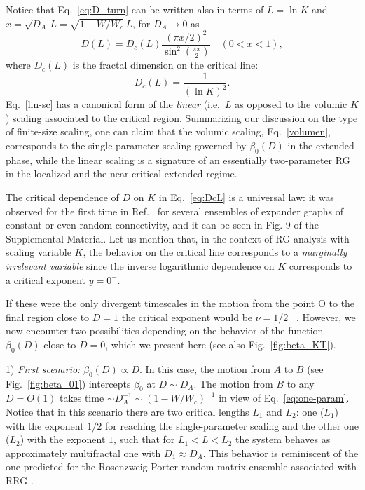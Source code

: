 \documentclass[reprint,aps,prl,superscriptaddress,english,nolongbibliography]{revtex4-1}
\begin{document}
Notice that Eq.~\eqref{eq:D_turn} can be written also in terms of $L=\ln K$ and  $x=\sqrt{D_A}\,L=\sqrt{1-W/W_{c}}\,L$, for $D_A\to 0$ as
\begin{equation}\label{lin-sc}
    D(L)=D_{c}(L) \frac{(\pi x/2)^{2}}{\sin^{2}(\frac{\pi x}{2})}\quad (0<x<1),
\end{equation}
where $D_{c}(L)$ is the fractal dimension on the critical line:
\begin{equation}
    D_c(L)=\frac{1}{(\ln K)^2}.
    \label{eq:DcL}
\end{equation}
Eq.~\eqref{lin-sc} has a canonical form of  the {\it linear} (i.e.\ $L$ as opposed to the volumic $K$ \cite{Mata2017Scaling}) scaling associated to the critical region. 
Summarizing our discussion on the type of finite-size scaling, one can claim that the volumic scaling, Eq.~\eqref{volumen}, corresponds to the single-parameter scaling governed by $\beta_{0}(D)$ in the extended phase, while the linear scaling is a signature of an essentially two-parameter RG in the localized and the near-critical extended regime.

The critical dependence of $D$ on $K$ in Eq.~\eqref{eq:DcL} is a universal law: it was observed for the first time in Ref.~\cite{sierant2023universality} for several ensembles of expander graphs of constant or even random connectivity, and it can be seen in Fig. 9 of the Supplemental Material.  Let us mention that, in the context of RG analysis with scaling variable $K$, the behavior on the critical line corresponds to a {\it marginally irrelevant variable} since the inverse logarithmic dependence on $K$ corresponds to a critical exponent $y=0^{-}$.

If these were the only divergent timescales in the motion from the point O to the final region close to $D=1$ the critical exponent would be $\nu=1/2$  ~\cite{zirnbauer1986localization,mirlin1991localization}. 
However, we now encounter two possibilities depending on the behavior of the function $\beta_0(D)$ close to $D=0$, which we present here (see also Fig.~\ref{fig:beta_KT}).

1) {\it First scenario:} $\beta_0(D)\propto D$. In this case, the motion from $A$ to $B$ (see Fig.~\ref{fig:beta_01}) intercepts $\beta_0$ at $D\sim D_A$. The motion from $B$ to any $D=O(1)$ takes time $ \sim D_A^{-1}\sim (1-W/W_c)^{-1}$ in view of Eq.~\eqref{eq:one-param}. Notice that in this scenario there are two critical lengths $L_{1}$ and $L_{2}$: one ($L_{1}$) with the exponent $1/2$ for reaching the single-parameter scaling   and the other one ($L_{2}$) with the exponent $1$, such that for $L_{1}<L<L_{2}$ the system behaves as approximately multifractal one with $D_{1}\approx D_{A}$. This behavior is reminiscent of the one predicted for the Rosenzweig-Porter random matrix ensemble associated with RRG \cite{LN-RP-RRG21}. 
\end{document}
